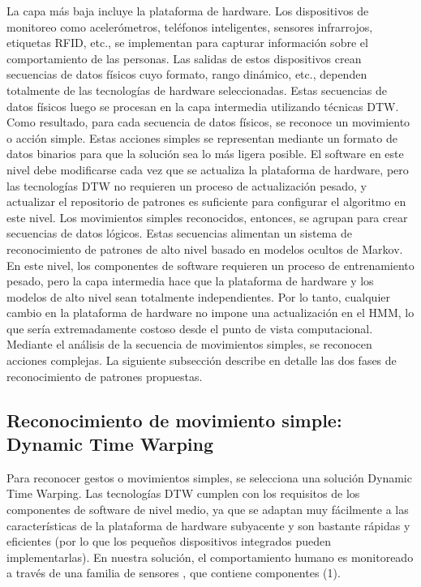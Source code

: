 \documentclass[10pt]{article}
\begin{document}
La capa más baja incluye la plataforma de hardware. Los dispositivos de monitoreo como acelerómetros, teléfonos inteligentes, sensores infrarrojos, etiquetas RFID, etc., se implementan para capturar información sobre el comportamiento de las personas. Las salidas de estos dispositivos crean secuencias de datos físicos cuyo formato, rango dinámico, etc., dependen totalmente de las tecnologías de hardware seleccionadas. Estas secuencias de datos físicos luego se procesan en la capa intermedia utilizando técnicas DTW. Como resultado, para cada secuencia de datos físicos, se reconoce un movimiento o acción simple. Estas acciones simples se representan mediante un formato de datos binarios para que la solución sea lo más ligera posible. El software en este nivel debe modificarse cada vez que se actualiza la plataforma de hardware, pero las tecnologías DTW no requieren un proceso de actualización pesado, y actualizar el repositorio de patrones es suficiente para configurar el algoritmo en este nivel. Los movimientos simples reconocidos, entonces, se agrupan para crear secuencias de datos lógicos. Estas secuencias alimentan un sistema de reconocimiento de patrones de alto nivel basado en modelos ocultos de Markov. En este nivel, los componentes de software requieren un proceso de entrenamiento pesado, pero la capa intermedia hace que la plataforma de hardware y los modelos de alto nivel sean totalmente independientes. Por lo tanto, cualquier cambio en la plataforma de hardware no impone una actualización en el HMM, lo que sería extremadamente costoso desde el punto de vista computacional. Mediante el análisis de la secuencia de movimientos simples, se reconocen acciones complejas. La siguiente subsección describe en detalle las dos fases de reconocimiento de patrones propuestas.

\subsection{Reconocimiento de movimiento simple: Dynamic Time Warping}
Para reconocer gestos o movimientos simples, se selecciona una solución Dynamic Time Warping. Las tecnologías DTW cumplen con los requisitos de los componentes de software de nivel medio, ya que se adaptan muy fácilmente a las características de la plataforma de hardware subyacente y son bastante rápidas y eficientes (por lo que los pequeños dispositivos integrados pueden implementarlas). En nuestra solución, el comportamiento humano es monitoreado a través de una familia de sensores , que contiene componentes (1). 
\end{document}
